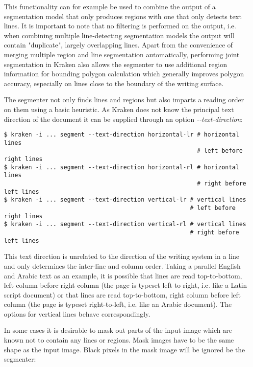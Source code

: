 This functionality can for example be used to combine the output of a
segmentation model that only produces regions with one that only detects text
lines. It is important to note that no filtering is performed on the output,
i.e. when combining multiple line-detecting segmentation models the output will
contain "duplicate", largely overlapping lines. Apart from the convenience of
merging multiple region and line segmentation automatically, performing joint
segmentation in Kraken also allows the segmenter to use additional region
information for bounding polygon calculation which generally improves polygon
accuracy, especially on lines close to the boundary of the writing surface.

The segmenter not only finds lines and regions but also imparts a reading order
on them using a basic heuristic. As Kraken does not know the principal text
direction of the document it can be supplied through an option
\emph{-{}-text-direction}: 

\begin{verbatim}
$ kraken -i ... segment --text-direction horizontal-lr # horizontal lines
                                                       # left before right lines
$ kraken -i ... segment --text-direction horizontal-rl # horizontal lines
                                                       # right before left lines
$ kraken -i ... segment --text-direction vertical-lr # vertical lines
                                                     # left before right lines
$ kraken -i ... segment --text-direction vertical-rl # vertical lines
                                                     # right before left lines
\end{verbatim}

This text direction is unrelated to the direction of the writing system in a
line and only determines the inter-line and column order. Taking a parallel
English and Arabic text as an example, it is possible that lines are read
top-to-bottom, left column before right column (the page is typeset
left-to-right, i.e. like a Latin-script document) or that lines are read
top-to-bottom, right column before left column (the page is typeset
right-to-left, i.e. like an Arabic document). The options for vertical lines
behave correspondingly.

In some cases it is desirable to mask out parts of the input image which are
known not to contain any lines or regions. Mask images have to be the same
shape as the input image. Black pixels in the mask image will be ignored be the
segmenter:

